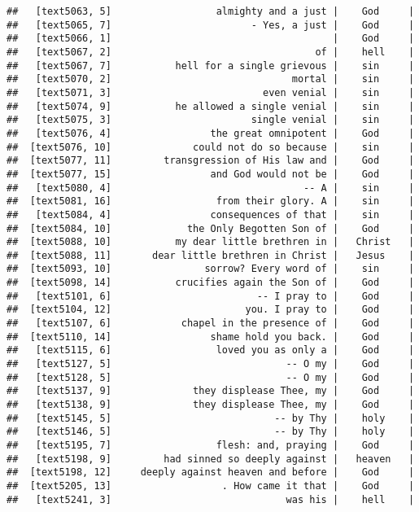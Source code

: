 \documentclass[]{article}
\begin{document}
\begin{verbatim}
##   [text5063, 5]                  almighty and a just |    God     |
##   [text5065, 7]                        - Yes, a just |    God     |
##   [text5066, 1]                                      |    God     |
##   [text5067, 2]                                   of |    hell    |
##   [text5067, 7]           hell for a single grievous |    sin     |
##   [text5070, 2]                               mortal |    sin     |
##   [text5071, 3]                          even venial |    sin     |
##   [text5074, 9]           he allowed a single venial |    sin     |
##   [text5075, 3]                        single venial |    sin     |
##   [text5076, 4]                 the great omnipotent |    God     |
##  [text5076, 10]              could not do so because |    sin     |
##  [text5077, 11]         transgression of His law and |    God     |
##  [text5077, 15]                 and God would not be |    God     |
##   [text5080, 4]                                 -- A |    sin     |
##  [text5081, 16]                  from their glory. A |    sin     |
##   [text5084, 4]                 consequences of that |    sin     |
##  [text5084, 10]             the Only Begotten Son of |    God     |
##  [text5088, 10]           my dear little brethren in |   Christ   |
##  [text5088, 11]       dear little brethren in Christ |   Jesus    |
##  [text5093, 10]                sorrow? Every word of |    sin     |
##  [text5098, 14]           crucifies again the Son of |    God     |
##   [text5101, 6]                         -- I pray to |    God     |
##  [text5104, 12]                       you. I pray to |    God     |
##   [text5107, 6]            chapel in the presence of |    God     |
##  [text5110, 14]                 shame hold you back. |    God     |
##   [text5115, 6]                  loved you as only a |    God     |
##   [text5127, 5]                              -- O my |    God     |
##   [text5128, 5]                              -- O my |    God     |
##   [text5137, 9]              they displease Thee, my |    God     |
##   [text5138, 9]              they displease Thee, my |    God     |
##   [text5145, 5]                            -- by Thy |    holy    |
##   [text5146, 5]                            -- by Thy |    holy    |
##   [text5195, 7]                  flesh: and, praying |    God     |
##   [text5198, 9]         had sinned so deeply against |   heaven   |
##  [text5198, 12]     deeply against heaven and before |    God     |
##  [text5205, 13]                   . How came it that |    God     |
##   [text5241, 3]                              was his |    hell    |

\end{verbatim}
\end{document}
